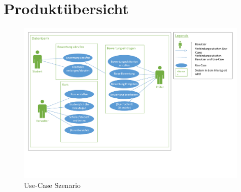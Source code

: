 \documentclass[a4paper,listof=leveldown,listof=numbered]{scrreprt}
\begin{document}
\chapter{Produktübersicht}
	\begin{figure}[H]
		\centering
		\includegraphics[width=0.99\textwidth]{../Use_Case.pdf}
		\caption{Use-Case Szenario}
	\end{figure}

	
\end{document}
